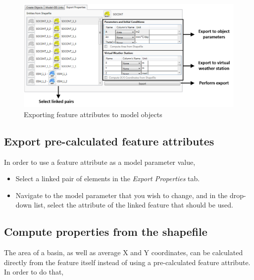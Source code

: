 \documentclass[
  letterpaper,
  DIV=11,
  numbers=noendperiod]{scrreprt}
\begin{document}
\begin{figure}

{\centering \includegraphics{./figures/fig-gis_exporting_feature_attributes.png}

}

\caption{\label{fig-gis_exporting_feature_attributes}Exporting feature
attributes to model objects}

\end{figure}

\hypertarget{export-pre-calculated-feature-attributes}{%
\subsection{Export pre-calculated feature
attributes}\label{export-pre-calculated-feature-attributes}}

In order to use a feature attribute as a model parameter value,

\begin{itemize}
\item
  {Select a linked pair of elements in the \emph{Export Properties}
  tab.}
\item
  {Navigate to the model parameter that you wish to change, and in the
  drop-down list, select the attribute of the linked feature that should
  be used.}
\end{itemize}

\hypertarget{compute-properties-from-the-shapefile}{%
\subsection{Compute properties from the
shapefile}\label{compute-properties-from-the-shapefile}}

The area of a basin, as well as average X and Y coordinates, can be
calculated directly from the feature itself instead of using a
pre-calculated feature attribute. In order to do that,
\end{document}
